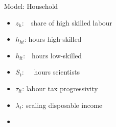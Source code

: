 \documentclass[11pt,aspectratio=169]{beamer}
\begin{document}
\begin{frame}{Model: Household}
\small
\vspace{4mm}
\begin{minipage}[t!]{0.4\textwidth}
	\vspace{7mm}
	\begin{itemize}
		\item[] $z_h$:\ \ share of high skilled labour \vspace{-2mm}
		\item[] $h_{ht}$: hours high-skilled\vspace{-2mm}
		\item[] $h_{lt}$:\ \ hours low-skilled\vspace{-2mm}
		\item[] $S_{t}$:\ \  \ hours scientists\vspace{-2mm}
	\end{itemize}
\end{minipage}
\begin{minipage}[t!]{0.35\textwidth}
	\vspace{8mm}
	\begin{itemize}
		\item[] $\tau_{lt}$: labour tax progressivity
		\vspace{-2mm}	
		\item[] $\lambda_{t}$: scaling disposable income
		\vspace{-2mm}	
		\item[]%
	\end{itemize}
\end{minipage}
\end{frame}
\end{document}
